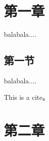 \documentclass{source/Paper}
\date{\today}
\begin{document}
    \makeheader
    \section{第一章}
    balabala....

    \subsection{第一节}
    balabala....
    
    This is a cite\cite{cheng2019ekiden}。
    
    \newpage
    \section{第二章}
    
    \newpage
    
    
\end{document}
